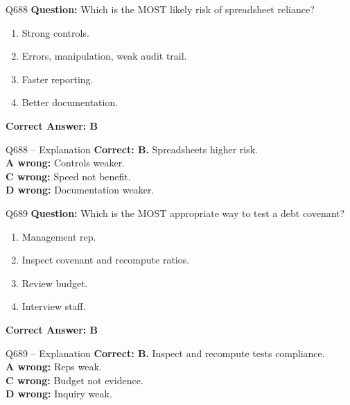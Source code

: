 \documentclass[aspectratio=169,10pt]{beamer}
\begin{document}
	\begin{frame}[t]{Q688}
		\small
		\textbf{Question:} Which is the MOST likely risk of spreadsheet reliance?
		\begin{enumerate}[label=\Alph*.,itemsep=1pt,topsep=2pt]
			\item Strong controls.
			\item Errors, manipulation, weak audit trail.
			\item Faster reporting.
			\item Better documentation.
		\end{enumerate}
		\vspace{4pt}
		\textbf{Correct Answer: B}
	\end{frame}
	
	\begin{frame}[t]{Q688 -- Explanation}
		\small
		\textbf{Correct: B.} Spreadsheets higher risk. \\[4pt]
		\textbf{A wrong:} Controls weaker. \\[2pt]
		\textbf{C wrong:} Speed not benefit. \\[2pt]
		\textbf{D wrong:} Documentation weaker.
	\end{frame}
	
	\begin{frame}[t]{Q689}
		\small
		\textbf{Question:} Which is the MOST appropriate way to test a debt covenant?
		\begin{enumerate}[label=\Alph*.,itemsep=1pt,topsep=2pt]
			\item Management rep.
			\item Inspect covenant and recompute ratios.
			\item Review budget.
			\item Interview staff.
		\end{enumerate}
		\vspace{4pt}
		\textbf{Correct Answer: B}
	\end{frame}
	
	\begin{frame}[t]{Q689 -- Explanation}
		\small
		\textbf{Correct: B.} Inspect and recompute tests compliance. \\[4pt]
		\textbf{A wrong:} Reps weak. \\[2pt]
		\textbf{C wrong:} Budget not evidence. \\[2pt]
		\textbf{D wrong:} Inquiry weak.
	\end{frame}
	
\end{document}
